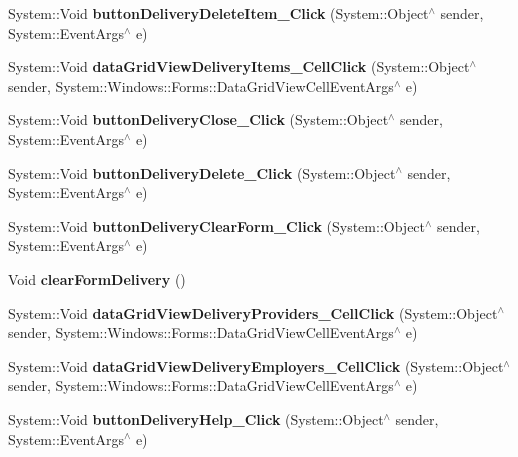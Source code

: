 \begin{DoxyCompactItemize}
\item 
\hypertarget{class_magazyn_1_1_magazin_a307440a9f7c2637db65bef29896cb339}{}\label{class_magazyn_1_1_magazin_a307440a9f7c2637db65bef29896cb339} 
System\+::\+Void {\bfseries button\+Delivery\+Delete\+Item\+\_\+\+Click} (System\+::\+Object$^\wedge$ sender, System\+::\+Event\+Args$^\wedge$ e)
\item 
\hypertarget{class_magazyn_1_1_magazin_a9329270816afd8fbdece19e8165e760d}{}\label{class_magazyn_1_1_magazin_a9329270816afd8fbdece19e8165e760d} 
System\+::\+Void {\bfseries data\+Grid\+View\+Delivery\+Items\+\_\+\+Cell\+Click} (System\+::\+Object$^\wedge$ sender, System\+::\+Windows\+::\+Forms\+::\+Data\+Grid\+View\+Cell\+Event\+Args$^\wedge$ e)
\item 
\hypertarget{class_magazyn_1_1_magazin_a67afa788e7c215ccc92963fe01709724}{}\label{class_magazyn_1_1_magazin_a67afa788e7c215ccc92963fe01709724} 
System\+::\+Void {\bfseries button\+Delivery\+Close\+\_\+\+Click} (System\+::\+Object$^\wedge$ sender, System\+::\+Event\+Args$^\wedge$ e)
\item 
\hypertarget{class_magazyn_1_1_magazin_a2779075855f3a65430f39561f362482d}{}\label{class_magazyn_1_1_magazin_a2779075855f3a65430f39561f362482d} 
System\+::\+Void {\bfseries button\+Delivery\+Delete\+\_\+\+Click} (System\+::\+Object$^\wedge$ sender, System\+::\+Event\+Args$^\wedge$ e)
\item 
\hypertarget{class_magazyn_1_1_magazin_aec5d557e622df716c8acf7a169ac18b9}{}\label{class_magazyn_1_1_magazin_aec5d557e622df716c8acf7a169ac18b9} 
System\+::\+Void {\bfseries button\+Delivery\+Clear\+Form\+\_\+\+Click} (System\+::\+Object$^\wedge$ sender, System\+::\+Event\+Args$^\wedge$ e)
\item 
\hypertarget{class_magazyn_1_1_magazin_a957014be87dcc6cbdbcda375872ef5be}{}\label{class_magazyn_1_1_magazin_a957014be87dcc6cbdbcda375872ef5be} 
Void {\bfseries clear\+Form\+Delivery} ()
\item 
\hypertarget{class_magazyn_1_1_magazin_a061791cc8134d6e273bde508633c0169}{}\label{class_magazyn_1_1_magazin_a061791cc8134d6e273bde508633c0169} 
System\+::\+Void {\bfseries data\+Grid\+View\+Delivery\+Providers\+\_\+\+Cell\+Click} (System\+::\+Object$^\wedge$ sender, System\+::\+Windows\+::\+Forms\+::\+Data\+Grid\+View\+Cell\+Event\+Args$^\wedge$ e)
\item 
\hypertarget{class_magazyn_1_1_magazin_a7af767862aed5bfae3bab7cd0cd06b11}{}\label{class_magazyn_1_1_magazin_a7af767862aed5bfae3bab7cd0cd06b11} 
System\+::\+Void {\bfseries data\+Grid\+View\+Delivery\+Employers\+\_\+\+Cell\+Click} (System\+::\+Object$^\wedge$ sender, System\+::\+Windows\+::\+Forms\+::\+Data\+Grid\+View\+Cell\+Event\+Args$^\wedge$ e)
\item 
\hypertarget{class_magazyn_1_1_magazin_ac7cbc5d98f7ab1c00d192ac65545f501}{}\label{class_magazyn_1_1_magazin_ac7cbc5d98f7ab1c00d192ac65545f501} 
System\+::\+Void {\bfseries button\+Delivery\+Help\+\_\+\+Click} (System\+::\+Object$^\wedge$ sender, System\+::\+Event\+Args$^\wedge$ e)
\end{DoxyCompactItemize}
